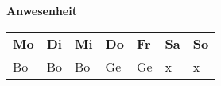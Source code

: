 ﻿%
\label{tbl:TTWeek1}
\begin{table}[right]
    \textbf{Anwesenheit}
    \hfill
    \begin{tabular}{|l|l|l|l|l|l|l|}
    \textbf{Mo} & \textbf{Di} & \textbf{Mi} & \textbf{Do} & \textbf{Fr} &
\textbf{Sa} & \textbf{So} \\

    Bo    & Bo    & Bo    & Ge    & Ge    & x     & x \\
    \end{tabular}%
\end{table}%

